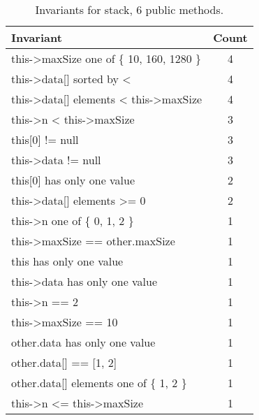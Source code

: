 \begin{table}[ht]
\centering
\scriptsize
\caption{Invariants for stack, 6 public methods.}
\label{stack_daikon}
\begin{tabular}{|l|c|}
\hline
Invariant & Count \\
\hline
this->maxSize one of \{ 10, 160, 1280 \} & 4 \\
this->data[] sorted by < & 4 \\
this->data[] elements < this->maxSize & 4 \\
this->n < this->maxSize & 3 \\
this[0] != null & 3 \\
this->data != null & 3 \\
this[0] has only one value & 2 \\
this->data[] elements >= 0 & 2 \\
this->n one of \{ 0, 1, 2 \} & 1 \\
this->maxSize == other.maxSize & 1 \\
this has only one value & 1 \\
this->data has only one value & 1 \\
this->n == 2 & 1 \\
this->maxSize == 10 & 1 \\
other.data has only one value & 1 \\
other.data[] == [1, 2] & 1 \\
other.data[] elements one of \{ 1, 2 \} & 1 \\
this->n <= this->maxSize & 1 \\
\hline
\end{tabular}
\end{table}

